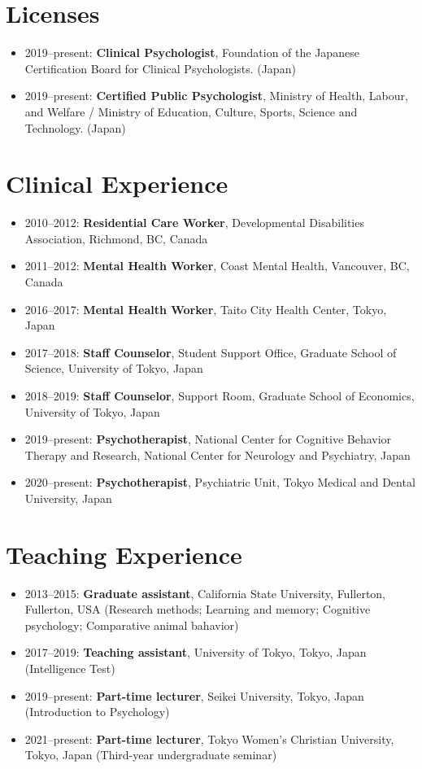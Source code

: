 \documentclass{article}
\begin{document}
\section{Licenses}
\begin{itemize}
	\item 2019--present: \textbf{Clinical Psychologist}, Foundation of the Japanese Certification Board for Clinical Psychologists. (Japan)
	\item 2019--present: \textbf{Certified Public Psychologist}, Ministry of Health, Labour, and Welfare / Ministry of Education, Culture, Sports, Science and Technology. (Japan)
\end{itemize} 

\section{Clinical Experience}
\begin{itemize}
	\item 2010--2012: \textbf{Residential Care Worker}, Developmental Disabilities Association, Richmond, BC, Canada
	\item 2011--2012: \textbf{Mental Health Worker}, Coast Mental Health, Vancouver, BC, Canada
	\item 2016--2017: \textbf{Mental Health Worker}, Taito City Health Center, Tokyo, Japan
	\item 2017--2018: \textbf{Staff Counselor}, Student Support Office, Graduate School of Science, University of Tokyo, Japan
	\item 2018--2019: \textbf{Staff Counselor}, Support Room, Graduate School of Economics, University of Tokyo, Japan
	\item 2019--present: \textbf{Psychotherapist}, National Center for Cognitive Behavior Therapy and Research, National Center for Neurology and Psychiatry, Japan
	\item 2020--present: \textbf{Psychotherapist}, Psychiatric Unit, Tokyo Medical and Dental University, Japan
\end{itemize}

\section{Teaching Experience}
\begin{itemize}
	\item 2013--2015: \textbf{Graduate assistant}, California State University, Fullerton, Fullerton, USA (Research methods; Learning and memory; Cognitive psychology; Comparative animal bahavior)
	\item 2017--2019: \textbf{Teaching assistant}, University of Tokyo, Tokyo, Japan (Intelligence Test)
	\item 2019--present: \textbf{Part-time lecturer}, Seikei University, Tokyo, Japan (Introduction to Psychology)
	\item 2021--present: \textbf{Part-time lecturer}, Tokyo Women's Christian University, Tokyo, Japan (Third-year undergraduate seminar)
\end{itemize}
\end{document}
